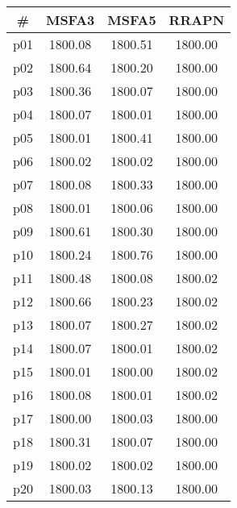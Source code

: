 \begin{tabular}{cccc}
\toprule
\textbf{\#} & \textbf{MSFA3} & \textbf{MSFA5} & \textbf{RRAPN}\\
\midrule
p01 & 1800.08 & 1800.51 & 1800.00\\
p02 & 1800.64 & 1800.20 & 1800.00\\
p03 & 1800.36 & 1800.07 & 1800.00\\
p04 & 1800.07 & 1800.01 & 1800.00\\
p05 & 1800.01 & 1800.41 & 1800.00\\
p06 & 1800.02 & 1800.02 & 1800.00\\
p07 & 1800.08 & 1800.33 & 1800.00\\
p08 & 1800.01 & 1800.06 & 1800.00\\
p09 & 1800.61 & 1800.30 & 1800.00\\
p10 & 1800.24 & 1800.76 & 1800.00\\
p11 & 1800.48 & 1800.08 & 1800.02\\
p12 & 1800.66 & 1800.23 & 1800.02\\
p13 & 1800.07 & 1800.27 & 1800.02\\
p14 & 1800.07 & 1800.01 & 1800.02\\
p15 & 1800.01 & 1800.00 & 1800.02\\
p16 & 1800.08 & 1800.01 & 1800.02\\
p17 & 1800.00 & 1800.03 & 1800.00\\
p18 & 1800.31 & 1800.07 & 1800.00\\
p19 & 1800.02 & 1800.02 & 1800.00\\
p20 & 1800.03 & 1800.13 & 1800.00\\
\bottomrule
\end{tabular}

